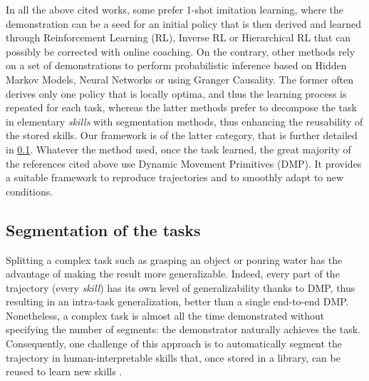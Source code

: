 \documentclass[conference]{IEEEtran}
\begin{document}
In all the above cited works, some prefer 1-shot imitation learning, where the demonstration can be a seed for an initial policy that is then derived and learned through Reinforcement Learning (RL)\cite{vecerik_practical_2019,stulp_reinforcement_2012}, Inverse RL\cite{rouot_inverse_2017} or Hierarchical RL\cite{zhao_variational_2023} that can possibly be corrected with online coaching\cite{advice_operator}. 
On the contrary, other methods rely on a set of demonstrations to perform probabilistic inference based on Hidden Markov Models\cite{rana_towards_2017}, Neural Networks\cite{zhang_deep_2018} or using Granger Causality\cite{chuck2023grangercausal}. The former often derives only one policy that is locally optima, and thus the learning process is repeated for each task, whereas the latter methods prefer to decompose the task in elementary \textit{skills} with segmentation methods, thus enhancing the reusability of the stored skills. Our framework is of the latter category, that is further detailed in \ref{Approach}. Whatever the method used, once the task learned, the great majority of the references cited above use Dynamic Movement Primitives (DMP)\cite{ijspeert_movement_2002,ijspeert_dynamical_2013}. It provides a suitable framework to reproduce trajectories and to smoothly adapt to new conditions. 

\subsection{Segmentation of the tasks} \label{Approach}

Splitting a complex task such as grasping an object or pouring water has the advantage of making the result more generalizable. Indeed, every part of the trajectory (every \textit{skill}) has its own level of generalizability thanks to DMP, thus resulting in an intra-task generalization, better than a single end-to-end DMP. Nonetheless, a complex task is almost all the time demonstrated without specifying the number of segments: the demonstrator naturally achieves the task. Consequently, one challenge of this approach is to automatically segment the trajectory in human-interpretable skills that, once stored in a library, can be reused to learn new skills \cite{meier_movement_2011}.
\end{document}
